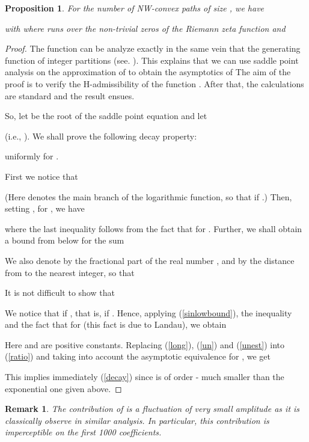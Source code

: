 \documentclass{article}
\newtheorem{proposition}[theorem]{Proposition}
\newtheorem{remark}[theorem]{Remark}
\begin{document}
 \begin{proposition}
 For the number  of NW-convex paths of size , we have


 
with 
where  runs over the non-trivial zeros of the Riemann zeta function and


 
 \end{proposition}
\begin{proof}
The function  can be analyze exactly in the same vein that the generating function of integer partitions (see. \cite[p574-578]{Flajolet2009}). This explains that we can use saddle point analysis on the approximation of  to obtain the asymptotics of  The aim of the proof is to verify the H-admissibility of the function . After that, the calculations are standard and the result ensues.

So, let  be the
root of the saddle point equation and let

(i.e., ). We shall prove the following decay property:

uniformly for .

 First we notice that
 
 (Here  denotes the main branch of the
logarithmic function, so that  if .) Then,
setting , for , we have

where the last inequality follows from the fact that
 for . Further, we
shall obtain a bound from below for the sum

We also denote by  the fractional part of the
 real number , and by  the
 distance from  to the nearest integer, so that
 
 It is not difficult to show that
 


 We notice that  if ,
 that is, if . Hence, applying
 (\ref{sinlowbound}), the inequality  and the fact that  for  (this fact is due to Landau), we obtain
 
 Here  and  are positive constants. Replacing
 (\ref{long}), (\ref{un}) and (\ref{unest}) into (\ref{ratio}) and
 taking into account the asymptotic equivalence for , we get
 
This implies immediately (\ref{decay}) since  is of
order  - much smaller than the exponential one
given above.



\end{proof}
\begin{remark}
The contribution of  is a fluctuation of very small amplitude as it is classically observe in similar analysis. 
In particular, this contribution is imperceptible on the first 1000 coefficients.
\end{remark}
\end{document}
